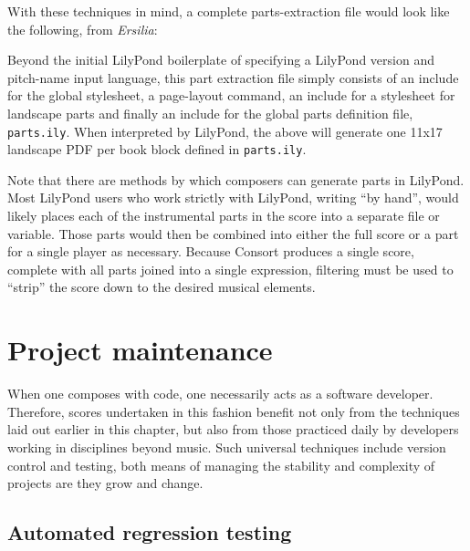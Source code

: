 With these techniques in mind, a complete parts-extraction file would
look like the following, from \emph{Ersilia}:


\noindent Beyond the initial LilyPond boilerplate of specifying a LilyPond
version and pitch-name input language, this part extraction file simply
consists of an include for the global stylesheet, a page-layout command, an
include for a stylesheet for landscape parts and finally an include for the
global parts definition file, \texttt{parts.ily}. When interpreted by LilyPond,
the above will generate one 11x17 landscape PDF per book block defined in
\texttt{parts.ily}.

Note that there are methods by which composers can generate parts in
LilyPond. Most LilyPond users who work strictly with LilyPond, writing
\enquote{by hand}, would likely places each of the instrumental parts in the
score into a separate file or variable. Those parts would then be combined into
either the full score or a part for a single player as necessary. Because
Consort produces a single score, complete with all parts joined into a single
expression, filtering must be used to \enquote{strip} the score down to the
desired musical elements.

\section{Project maintenance}
\label{sec:project-maintenance}

When one composes with code, one necessarily acts as a software developer.
Therefore, scores undertaken in this fashion benefit not only from the
techniques laid out earlier in this chapter, but also from those practiced
daily by developers working in disciplines beyond music. Such universal
techniques include version control and testing, both means of managing the
stability and complexity of projects are they grow and change.

\subsection{Automated regression testing}
\label{ssec:testing}

